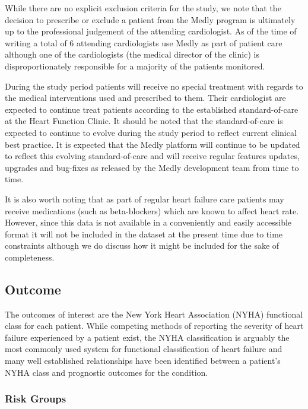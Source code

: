 \documentclass[]{article}
\begin{document}
While there are no explicit exclusion criteria for the study, we note that the decision to prescribe or exclude a patient from the Medly program is ultimately up to the professional judgement of the attending cardiologist. As of the time of writing a total of 6 attending cardiologists use Medly as part of patient care although one of the cardiologists (the medical director of the clinic) is disproportionately responsible for a majority of the patients monitored.

During the study period patients will receive no special treatment with regards to the medical interventions used and prescribed to them. Their cardiologist are expected to continue treat patients according to the established standard-of-care at the Heart Function Clinic. It should be noted that the standard-of-care is expected to continue to evolve during the study period to reflect current clinical best practice. It is expected that the Medly platform will continue to be updated to reflect this evolving standard-of-care and will receive regular features updates, upgrades and bug-fixes as released by the Medly development team from time to time.

It is also worth noting that as part of regular heart failure care patients may receive medications (such as beta-blockers) which are known to affect heart rate. However, since this data is not available in a conveniently and easily accessible format it will not be included in the dataset at the present time due to time constraints although we do discuss how it might be included for the sake of completeness.


\subsection{Outcome} %

The outcomes of interest are the New York Heart Association (NYHA) functional class for each patient. While competing methods of reporting the severity of heart failure experienced by a patient exist, the NYHA classification is arguably the most commonly used system for functional classification of heart failure and many well established relationships have been identified between a patient's NYHA class and prognostic outcomes for the condition. 

\subsubsection{Risk Groups} %
\end{document}
